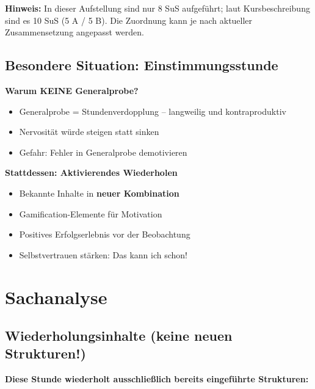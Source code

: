 \documentclass[11pt,a4paper]{article}
\begin{document}
\vspace{1em}

\textbf{Hinweis:} In dieser Aufstellung sind nur 8 SuS aufgeführt; laut Kursbeschreibung sind es 10 SuS (5 A / 5 B). Die Zuordnung kann je nach aktueller Zusammensetzung angepasst werden.

\subsection{Besondere Situation: Einstimmungsstunde}

\begin{infobox}
\textbf{Warum KEINE Generalprobe?}
\begin{itemize}
    \item Generalprobe = \glqq{}Stundenverdopplung\grqq{} -- langweilig und kontraproduktiv
    \item Nervosität würde steigen statt sinken
    \item Gefahr: Fehler in Generalprobe demotivieren
\end{itemize}

\textbf{Stattdessen: Aktivierendes Wiederholen}
\begin{itemize}
    \item Bekannte Inhalte in \textbf{neuer Kombination}
    \item Gamification-Elemente für Motivation
    \item Positives Erfolgserlebnis vor der Beobachtung
    \item Selbstvertrauen stärken: \glqq{}Das kann ich schon!\grqq{}
\end{itemize}
\end{infobox}

\section{Sachanalyse}

\subsection{Wiederholungsinhalte (keine neuen Strukturen!)}

\textbf{Diese Stunde wiederholt ausschließlich bereits eingeführte Strukturen:}
\end{document}
